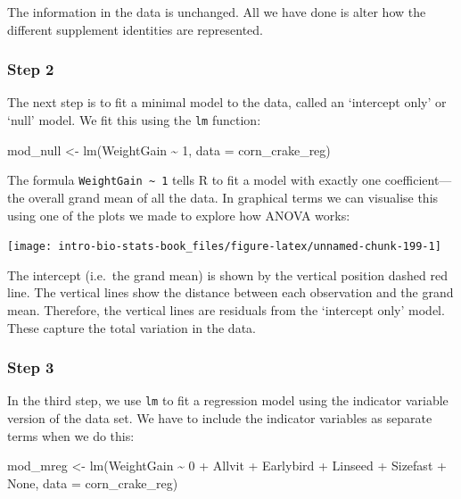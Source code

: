 \documentclass[
]{book}
\newenvironment{Shaded}{\begin{snugshade}}{\end{snugshade}}
\newcommand{\AttributeTok}[1]{\textcolor[rgb]{0.77,0.63,0.00}{#1}}
\newcommand{\DecValTok}[1]{\textcolor[rgb]{0.00,0.00,0.81}{#1}}
\newcommand{\FunctionTok}[1]{\textcolor[rgb]{0.00,0.00,0.00}{#1}}
\newcommand{\NormalTok}[1]{#1}
\newcommand{\OtherTok}[1]{\textcolor[rgb]{0.56,0.35,0.01}{#1}}
\newcommand{\SpecialCharTok}[1]{\textcolor[rgb]{0.00,0.00,0.00}{#1}}
\begin{document}
The information in the data is unchanged. All we have done is alter how the different supplement identities are represented.

\hypertarget{step-2}{%
\subsubsection{Step 2}\label{step-2}}

The next step is to fit a minimal model to the data, called an `intercept only' or `null' model. We fit this using the \texttt{lm} function:

\begin{Shaded}
\begin{Highlighting}[]
\NormalTok{mod\_null }\OtherTok{\textless{}{-}} \FunctionTok{lm}\NormalTok{(WeightGain }\SpecialCharTok{\textasciitilde{}} \DecValTok{1}\NormalTok{, }\AttributeTok{data =}\NormalTok{ corn\_crake\_reg)}
\end{Highlighting}
\end{Shaded}

The formula \texttt{WeightGain\ \textasciitilde{}\ 1} tells R to fit a model with exactly one coefficient---the overall grand mean of all the data. In graphical terms we can visualise this using one of the plots we made to explore how ANOVA works:

\begin{center}\texttt{[image: intro-bio-stats-book\_files/figure-latex/unnamed-chunk-199-1]} \end{center}

The intercept (i.e.~the grand mean) is shown by the vertical position dashed red line. The vertical lines show the distance between each observation and the grand mean. Therefore, the vertical lines are residuals from the `intercept only' model. These capture the total variation in the data.

\hypertarget{step-3}{%
\subsubsection{Step 3}\label{step-3}}

In the third step, we use \texttt{lm} to fit a regression model using the indicator variable version of the data set. We have to include the indicator variables as separate terms when we do this:

\begin{Shaded}
\begin{Highlighting}[]
\NormalTok{mod\_mreg }\OtherTok{\textless{}{-}} \FunctionTok{lm}\NormalTok{(WeightGain }\SpecialCharTok{\textasciitilde{}} \DecValTok{0} \SpecialCharTok{+}\NormalTok{ Allvit }\SpecialCharTok{+}\NormalTok{ Earlybird }\SpecialCharTok{+}\NormalTok{ Linseed }\SpecialCharTok{+}\NormalTok{ Sizefast }\SpecialCharTok{+}\NormalTok{ None, }\AttributeTok{data =}\NormalTok{ corn\_crake\_reg)}
\end{Highlighting}
\end{Shaded}
\end{document}

